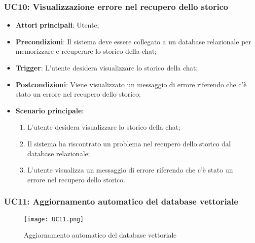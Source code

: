 \subsubsection{UC10: Visualizzazione errore nel recupero dello storico}
\begin{itemize}
    \item \textbf{Attori principali}: Utente;
    \item \textbf{Precondizioni}: Il sistema deve essere collegato a un database relazionale per memorizzare e recuperare lo storico della chat;
    \item \textbf{Trigger}: L'utente desidera visualizzare lo storico della chat;
    \item \textbf{Postcondizioni}: Viene visualizzato un messaggio di errore riferendo che c'è stato un errore nel recupero dello storico;
    \item \textbf{Scenario principale}: 
    \begin{enumerate}
        \item L'utente desidera visualizzare lo storico della chat;
        \item Il sistema ha riscontrato un problema nel recupero dello storico dal database relazionale;
        \item L'utente visualizza un messaggio di errore riferendo che c'è stato un errore nel recupero dello storico.
    \end{enumerate}
\end{itemize}


\hypertarget{UC11}{}
\subsubsection{UC11: Aggiornamento automatico del database vettoriale}

\begin{figure}[h]
    \centering
    \texttt{[image: UC11.png]}
    \caption{Aggiornamento automatico del database vettoriale}
\end{figure}

